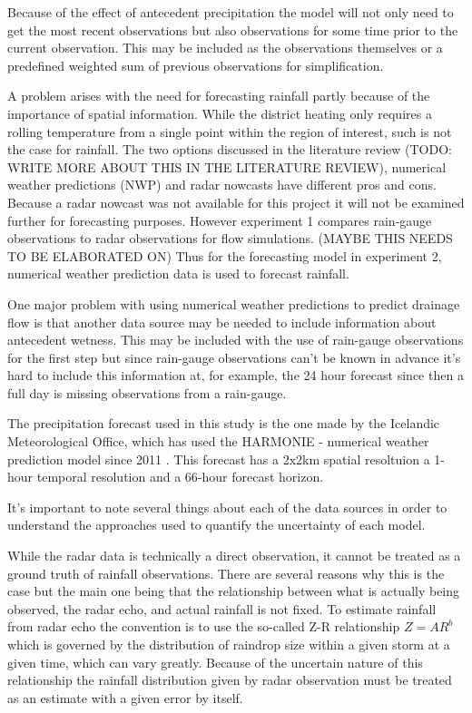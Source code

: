 Because of the effect of antecedent precipitation the model will not only need to get the most recent observations but also observations for some time prior to the current observation. This may be included as the observations themselves or a predefined weighted sum of previous observations for simplification.

A problem arises with the need for forecasting rainfall partly because of the importance of spatial information. While the district heating only requires a rolling temperature from a single point within the region of interest, such is not the case for rainfall. The two options discussed in the literature review (TODO: WRITE MORE ABOUT THIS IN THE LITERATURE REVIEW), numerical weather predictions (NWP) and radar nowcasts have different pros and cons. Because a radar nowcast was not available for this project it will not be examined further for forecasting purposes. However experiment 1 compares rain-gauge observations to radar observations for flow simulations. (MAYBE THIS NEEDS TO BE ELABORATED ON) Thus for the forecasting model in experiment 2, numerical weather prediction data is used to forecast rainfall. 

One major problem with using numerical weather predictions to predict drainage flow is that another data source may be needed to include information about antecedent wetness. This may be included with the use of rain-gauge observations for the first step but since rain-gauge observations can't be known in advance it's hard to include this information at, for example, the 24 hour forecast since then a full day is missing observations from a rain-gauge. 

The precipitation forecast used in this study is the one made by the Icelandic Meteorological Office, which has used the HARMONIE - numerical weather prediction model since 2011 \cite{vedurstofaharmonie}. This forecast has a 2x2km spatial resoltuion a 1-hour temporal resolution and a 66-hour forecast horizon.

It's important to note several things about each of the data sources in order to understand the approaches used to quantify the uncertainty of each model. 

While the radar data is technically a direct observation, it cannot be treated as a ground truth  of rainfall observations. There are several reasons why this is the case but the main one being that the relationship between what is actually being observed, the radar echo, and actual rainfall is not fixed. To estimate rainfall from radar echo the convention is to use the so-called Z-R relationship $Z=AR^b$ which is governed by the distribution of raindrop size within a given storm at a given time, which can vary greatly\cite{ZRrelationship}.  Because of the uncertain nature of this relationship the rainfall distribution given by radar observation must be treated as an estimate with a given error by itself.

